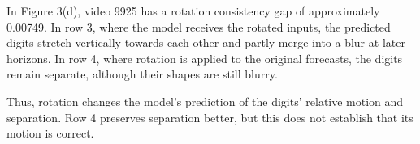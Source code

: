 In Figure 3(d), video 9925 has a rotation consistency gap of approximately 0.00749. In row 3, where the model receives the rotated inputs, the predicted digits stretch vertically towards each other and partly merge into a blur at later horizons. In row 4, where rotation is applied to the original forecasts, the digits remain separate, although their shapes are still blurry.

Thus, rotation changes the model's prediction of the digits' relative motion and separation. Row 4 preserves separation better, but this does not establish that its motion is correct.
